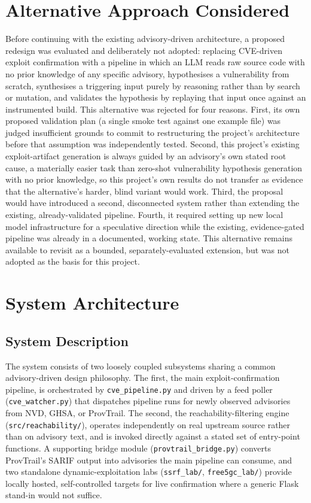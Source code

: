 \documentclass[12pt,a4paper]{report}
\begin{document}
\section{Alternative Approach Considered}

Before continuing with the existing advisory-driven architecture, a proposed redesign was evaluated and deliberately not adopted: replacing CVE-driven exploit confirmation with a pipeline in which an LLM reads raw source code with no prior knowledge of any specific advisory, hypothesises a vulnerability from scratch, synthesises a triggering input purely by reasoning rather than by search or mutation, and validates the hypothesis by replaying that input once against an instrumented build. This alternative was rejected for four reasons. First, its own proposed validation plan (a single smoke test against one example file) was judged insufficient grounds to commit to restructuring the project's architecture before that assumption was independently tested. Second, this project's existing exploit-artifact generation is always guided by an advisory's own stated root cause, a materially easier task than zero-shot vulnerability hypothesis generation with no prior knowledge, so this project's own results do not transfer as evidence that the alternative's harder, blind variant would work. Third, the proposal would have introduced a second, disconnected system rather than extending the existing, already-validated pipeline. Fourth, it required setting up new local model infrastructure for a speculative direction while the existing, evidence-gated pipeline was already in a documented, working state. This alternative remains available to revisit as a bounded, separately-evaluated extension, but was not adopted as the basis for this project.

\section{System Architecture}

\subsection{System Description}

The system consists of two loosely coupled subsystems sharing a common advisory-driven design philosophy. The first, the main exploit-confirmation pipeline, is orchestrated by \texttt{cve\_pipeline.py} and driven by a feed poller (\texttt{cve\_watcher.py}) that dispatches pipeline runs for newly observed advisories from NVD, GHSA, or ProvTrail. The second, the reachability-filtering engine (\texttt{src/reachability/}), operates independently on real upstream source rather than on advisory text, and is invoked directly against a stated set of entry-point functions. A supporting bridge module (\texttt{provtrail\_bridge.py}) converts ProvTrail's SARIF output into advisories the main pipeline can consume, and two standalone dynamic-exploitation labs (\texttt{ssrf\_lab/}, \texttt{free5gc\_lab/}) provide locally hosted, self-controlled targets for live confirmation where a generic Flask stand-in would not suffice.
\end{document}
